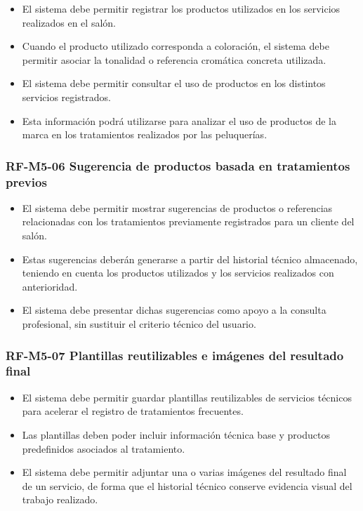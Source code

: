 \begin{itemize}
    \item El sistema debe permitir registrar los productos utilizados en los servicios realizados en el salón.
    \item Cuando el producto utilizado corresponda a coloración, el sistema debe permitir asociar la tonalidad o referencia cromática concreta utilizada.
    \item El sistema debe permitir consultar el uso de productos en los distintos servicios registrados.
    \item Esta información podrá utilizarse para analizar el uso de productos de la marca en los tratamientos realizados por las peluquerías.
\end{itemize}

\vspace{-0.75em}
\subsubsection{RF-M5-06 Sugerencia de productos basada en tratamientos previos}
\vspace{-1em}

\begin{itemize}
    \item El sistema debe permitir mostrar sugerencias de productos o referencias relacionadas con los tratamientos previamente registrados para un cliente del salón.
    \item Estas sugerencias deberán generarse a partir del historial técnico almacenado, teniendo en cuenta los productos utilizados y los servicios realizados con anterioridad.
    \item El sistema debe presentar dichas sugerencias como apoyo a la consulta profesional, sin sustituir el criterio técnico del usuario.
\end{itemize}

\vspace{-0.75em}
\subsubsection{RF-M5-07 Plantillas reutilizables e imágenes del resultado final}
\vspace{-1em}

\begin{itemize}
    \item El sistema debe permitir guardar plantillas reutilizables de servicios técnicos para acelerar el registro de tratamientos frecuentes.
    \item Las plantillas deben poder incluir información técnica base y productos predefinidos asociados al tratamiento.
    \item El sistema debe permitir adjuntar una o varias imágenes del resultado final de un servicio, de forma que el historial técnico conserve evidencia visual del trabajo realizado.
\end{itemize}

